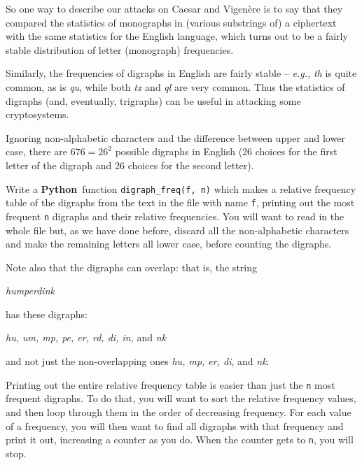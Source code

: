 \documentclass[12pt,letterpaper]{amsbook}
\theoremstyle{definition}
\theoremstyle{remark}
\numberwithin{figure}{section}
\numberwithin{exercise}{chapter}
\numberwithin{section}{chapter}
\numberwithin{equation}{section}
\numberwithin{table}{subsection}
\newcommand{\code}[1]{\colorbox{lg}{\texttt{#1}}}
\newcommand{\Python}{{\textbf{\ix{Python}}}}
\newcommand{\ix}[1]{{#1}\index{#1}}
\begin{document}
So one way to describe our attacks on Caesar and Vigen\`ere is to say that they
compared the statistics of monographs in (various substrings of) a ciphertext
with the same statistics for the English language, which turns out to be a
fairly stable distribution of letter (monograph) frequencies.

Similarly, the frequencies of digraphs in English are fairly stable --
\textit{e.g.,} \textit{th} is quite common, as is \textit{qu}, while both
\textit{tx} and \textit{ql} are very common.  Thus the statistics of
digraphs (and, eventually, trigraphs) can be useful in attacking some
cryptosystems.

\begin{BTtcb}[label=bt:digraph]{}{}
Ignoring non-alphabetic characters and the difference between upper and lower
case, there are $676=26^2$ possible digraphs in English (26 choices for the
first letter of the digraph and 26 choices for the second letter).

Write a \Python\ function \code{digraph\_freq(f, n)} which makes a
relative frequency table of the digraphs from the text in the file with
name \code{f}, printing out the most frequent \code{n} digraphs and
their relative frequencies.  You will want to read in the whole file but, as
we have done before, discard all the non-alphabetic characters and make the
remaining letters all lower case, before counting the digraphs.

Note also that the digraphs can overlap: that is, the string
\begin{center}
\textit{humperdink}
\end{center}
has these digraphs:
\begin{center}
\textit{hu, um, mp, pe, er, rd, di, in,} and \textit{nk}
\end{center}
and not just the non-overlapping ones \textit{hu, mp, er, di}, and \textit{nk}.

Printing out the entire relative frequency table is easier than just the
\code{n} most frequent digraphs.  To do that, you will want to sort the
relative frequency values, and then loop through them in the order of decreasing
frequency.  For each value of a frequency, you will then want to find all
digraphs with that frequency and print it out, increasing a counter as you do.
When the counter gets to \code{n}, you will stop.
\end{BTtcb}
\end{document}
